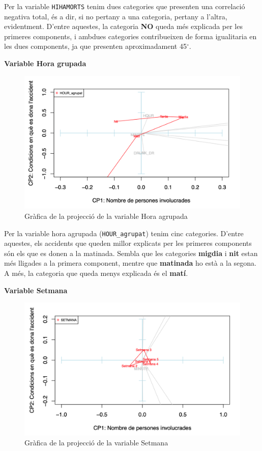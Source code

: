 \documentclass[12pt,longbibliography]{article}
\theoremstyle{definition}
\theoremstyle{remark}
\begin{document}
Per la variable \texttt{HIHAMORTS} tenim dues categories que presenten una correlació negativa total, és a dir, si no pertany a una categoria, pertany a l'altra, evidentment. D'entre aquestes, la categoria \textbf{NO} queda més explicada per les primeres components, i ambdues categories contribueixen de forma igualitaria en les dues components, ja que presenten aproximadament 45$^{\circ}$.


\textbf{Variable Hora grupada}

\begin{figure}[H]
\begin{center}
\includegraphics[width=12cm]{acp11}
\end{center}
\caption{Gràfica de la projecció de la variable Hora agrupada}
\label{fig:ACP11}
\end{figure}

Per la variable hora agrupada (\texttt{HOUR\_agrupat}) tenim cinc categories. D'entre aquestes, els accidents que queden millor explicats per les primeres components són els que es donen a la matinada. Sembla que les categories \textbf{migdia} i \textbf{nit} estan més lligades a la primera component, mentre que \textbf{matinada} ho està a la segona. A més, la categoria que queda menys explicada és el \textbf{matí}.



\textbf{Variable Setmana}

\begin{figure}[H]
\begin{center}
\includegraphics[width=12cm]{acp12}
\end{center}
\caption{Gràfica de la projecció de la variable Setmana}
\label{fig:ACP12}
\end{figure}
\end{document}
